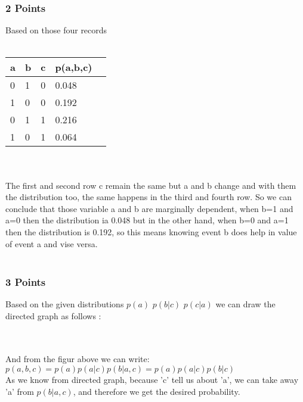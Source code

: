 \subsubsection{2 Points}
Based on those four records \\ \\
  \begin{tabular}{ | l | l | l | l | l |}
	    \hline
a &  b  &  c &   p(a,b,c)  \\ \hline
0	&   1	 &	0  & 0.048              \\ \hline
1	&   0	 &	0  &  0.192	          \\ \hline
0	&   1	 &	1  &  0.216	          \\ \hline
1	&   0	 &	1  &  0.064              \\ \hline

  \end{tabular}
\\ \\
The first and second row c remain the same but a and b change and with them the distribution too, the same happens in the third and fourth row. So we can conclude that those variable a and b are marginally dependent, when b=1 and a=0 then the distribution ia 0.048 but in the other hand, when b=0 and a=1 then the distribution is 0.192, so this means  knowing event b does help in value of event a and vise versa. \\ \\
\subsubsection{3 Points}

Based on the given distributions $p(a)$ $p(b|c)$ $p(c|a)$ we can draw the directed graph as follows :\\ \\
 \\
And from the figur above we can write:\\
$p(a,b,c)=p(a)p(a|c)p(b|a,c)
	    =p(a)p(a|c)p(b|c)$ \\
As we know from directed graph, because 'c' tell us about 'a', we can take away 'a' from $p(b|a,c)$, and therefore we get the desired probability.  


